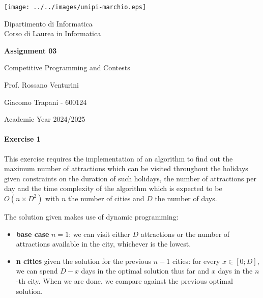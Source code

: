 \documentclass[12pt]{report}
\theoremstyle{definition}
\theoremstyle{definition}
\begin{document}
\begin{titlepage}
	\clearpage\thispagestyle{empty}
	\centering
	\vspace{1cm}

	\texttt{[image: ../../images/unipi-marchio.eps]}

	{\normalsize \noindent Dipartimento di Informatica \\
			Corso di Laurea in Informatica \par}
	
	\vspace{2cm}
	{\huge \textbf{Assignment 03} \par }
	\vspace{1cm}
	{\large Competitive Programming and Contests}

	\vspace{3cm}

	\begin{minipage}[t]{0.47\textwidth}
		{\large{Prof. Rossano Venturini}}
	\end{minipage}\hfill\begin{minipage}[t]{0.47\textwidth}\raggedleft
		{\large {Giacomo Trapani - 600124}}
	\end{minipage}

	\vspace{3cm}

	{\normalsize Academic Year 2024/2025 \par}

	\pagebreak
\end{titlepage}
\paragraph*{Exercise 1}
This exercise requires the implementation of an algorithm to find out the maximum
number of attractions which can be visited throughout the holidays given
constraints on the duration of such holidays, the number of attractions
per day and the time complexity of the algorithm which is expected to be
\(O(n \times D^2)\) with \(n\) the number of cities and \(D\) the number of days.

The solution given makes use of dynamic programming:
\begin{itemize}
	\item \textbf{base case} \(n = 1\): we can visit either \(D\) attractions or the
	number of attractions available in the city, whichever is the lowest.
	\item \textbf{n cities} given the solution for the previous \(n-1\) cities:
	for every \(x \in [0; D]\), we can spend \(D-x\) days in the optimal solution
	thus far and \(x\) days in the \(n\)-th city. When we are done, we compare
	against the previous optimal solution.
\end{itemize}
\end{document}
